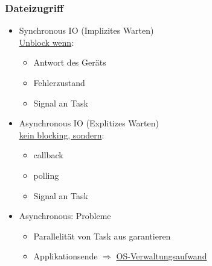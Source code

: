 \subsubsection{Dateizugriff}
\begin{itemize}
	\item Synchronous IO (Implizites Warten) \\
	\underline{Unblock wenn}:
	\begin{itemize}
		\item Antwort des Geräts
		\item Fehlerzustand
		\item Signal an Task
	\end{itemize}
	
	\item Asynchronous IO (Explitizes Warten) \\
	\underline{kein blocking, sondern}:
	\begin{itemize}
		\item callback
		\item polling
		\item Signal an Task
	\end{itemize}
	
	\item Asynchronous: Probleme
	\begin{itemize}
		\item Parallelität von Task aus garantieren
		\item Applikationsende $\Rightarrow$ \underline{OS-Verwaltungsaufwand}
	\end{itemize}
\end{itemize}
